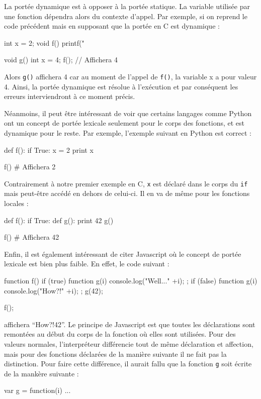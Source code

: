 \documentclass[11pt,a4paper]{report}
\begin{document}
La portée dynamique est à opposer à la portée statique. La variable utilisée
par une fonction dépendra alors du contexte d'appel. Par exemple, si on reprend
le code précédent mais en supposant que la portée en C est dynamique :
\begin{C}
int x = 2;
void f() {
  printf("%
}

void g() {
  int x = 4;
  f(); // Affichera 4
}
\end{C}
Alors \texttt{g()} affichera 4 car au moment de l'appel de \texttt{f()}, la
variable x a pour valeur 4. Ainsi, la portée dynamique est résolue à l'exécution
et par conséquent les erreurs interviendront à ce moment précis.

Néanmoins, il peut être intéressant de voir que certains langages comme Python
\cite{python-spec} ont un concept de portée lexicale seulement pour le corps des
fonctions, et est dynamique pour le reste. Par exemple, l'exemple suivant en
Python est correct :
\begin{Python}
def f(): 
    if True:
        x = 2
    print x

f() # Affichera 2
\end{Python}
Contrairement à notre premier exemple en C, \texttt{x} est déclaré dans le corps
du \texttt{if} mais peut-être accédé en dehors de celui-ci. Il en va de même
pour les fonctions locales :
\begin{Python}
def f():
    if True:
        def g():
            print 42
    g()

f() # Affichera 42
\end{Python}

Enfin, il est également intéressant de citer Javascript où le concept de portée
lexicale est bien plus faible. En effet, le code suivant :
\begin{JS}
function f() {
  if (true) {
    function g(i) {
      console.log("Well..." +i);
    };
  }
  if (false) {
    function g(i) {
      console.log("How?!" +i);
    };
  }
  g(42);
}

f();
\end{JS}
affichera ``How?!42''. Le principe de Javascript est que toutes les déclarations
sont remontées au début du corps de la fonction où elles sont utilisées. Pour
des valeurs normales, l'interpréteur différencie tout de même déclaration et
affection, mais pour des fonctions déclarées de la manière suivante il ne fait
pas la distinction. Pour faire cette différence, il aurait fallu que la fonction
\texttt{g} soit écrite de la mankère suivante : 
\begin{JS}
var g = function(i) { ... }
\end{JS}
\end{document}
